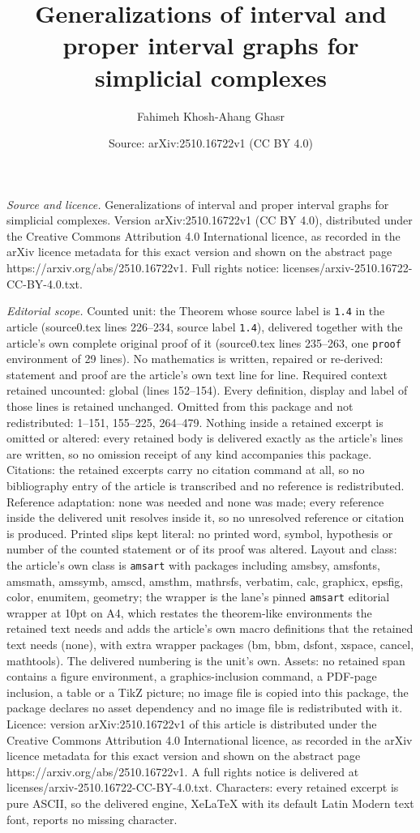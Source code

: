 \documentclass[10pt,a4paper]{amsart}
\title[Generalizations of interval and proper interval graphs for s]{Generalizations of interval and proper interval graphs for simplicial complexes}
\author{Fahimeh Khosh-Ahang Ghasr}
\date{Source: arXiv:2510.16722v1 (CC BY 4.0)}
\begin{document}
\maketitle

\noindent\emph{Source and licence.} Generalizations of interval and proper interval graphs for simplicial complexes. Version arXiv:2510.16722v1 (CC BY 4.0), distributed under the Creative Commons Attribution 4.0 International licence, as recorded in the arXiv licence metadata for this exact version and shown on the abstract page https://arxiv.org/abs/2510.16722v1. Full rights notice: licenses/arxiv-2510.16722-CC-BY-4.0.txt.\par\smallskip

\noindent\textit{Editorial scope.} Counted unit: the Theorem whose source label is \texttt{1.4} in the article (source0.tex lines 226--234, source label \texttt{1.4}), delivered together with the article's own complete original proof of it (source0.tex lines 235--263, one \texttt{proof} environment of 29 lines). No mathematics is written, repaired or re-derived: statement and proof are the article's own text line for line. Required context retained uncounted: global (lines 152--154). Every definition, display and label of those lines is retained unchanged. Omitted from this package and not redistributed: 1--151, 155--225, 264--479. Nothing inside a retained excerpt is omitted or altered: every retained body is delivered exactly as the article's lines are written, so no omission receipt of any kind accompanies this package. Citations: the retained excerpts carry no citation command at all, so no bibliography entry of the article is transcribed and no reference is redistributed. Reference adaptation: none was needed and none was made; every reference inside the delivered unit resolves inside it, so no unresolved reference or citation is produced. Printed slips kept literal: no printed word, symbol, hypothesis or number of the counted statement or of its proof was altered. Layout and class: the article's own class is \texttt{amsart} with packages including amsbsy, amsfonts, amsmath, amssymb, amscd, amsthm, mathrsfs, verbatim, calc, graphicx, epsfig, color, enumitem, geometry; the wrapper is the lane's pinned \texttt{amsart} editorial wrapper at 10pt on A4, which restates the theorem-like environments the retained text needs and adds the article's own macro definitions that the retained text needs (none), with extra wrapper packages (bm, bbm, dsfont, xspace, cancel, mathtools). The delivered numbering is the unit's own. Assets: no retained span contains a figure environment, a graphics-inclusion command, a PDF-page inclusion, a table or a TikZ picture; no image file is copied into this package, the package declares no asset dependency and no image file is redistributed with it. Licence: version arXiv:2510.16722v1 of this article is distributed under the Creative Commons Attribution 4.0 International licence, as recorded in the arXiv licence metadata for this exact version and shown on the abstract page https://arxiv.org/abs/2510.16722v1. A full rights notice is delivered at licenses/arxiv-2510.16722-CC-BY-4.0.txt. Characters: every retained excerpt is pure ASCII, so the delivered engine, XeLaTeX with its default Latin Modern text font, reports no missing character.
\end{document}

